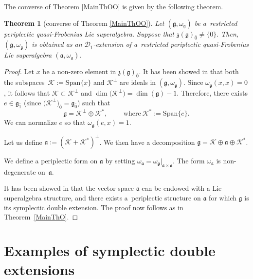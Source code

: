 \documentclass[pdftex]{sigma}
\numberwithin{equation}{section}
\newtheorem{Theorem}{Theorem}[section]
\begin{document}
The converse of Theorem \ref{MainThOO} is given by the following theorem.

\begin{Theorem}[converse of Theorem \ref{MainThOO}]
\label{Rec4}
Let $(\mathfrak{g},\omega_\mathfrak{g})$ be a~restricted periplectic quasi-Frobenius Lie superalgebra. Suppose that $\mathfrak{z}(\mathfrak{g})_{\bar 0}\not=\{0\}.$ Then, $(\mathfrak{g},\omega_\mathfrak{g})$ is obtained as an ${\mathscr D}_{\bar 1}$-extension of a~restricted periplectic quasi-Frobenius Lie superalgebra $(\mathfrak{a},\omega_\mathfrak{a})$.

\end{Theorem}
\begin{proof}

Let $x$ be a non-zero element in $\mathfrak{z}(\mathfrak{g})_{\bar 0}$. It has been showed in \cite{BM} that both the subspaces~$\mathscr{K}:=\mathrm{Span}\{x\}$ and $\mathscr{K}^\perp$ are ideals in $(\mathfrak{g},\omega_\mathfrak{g})$. Since $\omega_\mathfrak{g}(x,x)=0$, it follows that $\mathscr{K}\subset \mathscr{K}^\perp$ and $\dim\bigl(\mathscr{K}^\perp\bigr)=\dim(\mathfrak{g})-1$. Therefore, there exists $e \in \mathfrak{g}_{\bar 1}$ \big(since $\bigl(\mathscr{K}^\perp\bigr)_{\bar 0}=\mathfrak{g}_{\bar 0}$\big) such that
\[
\mathfrak{g}=\mathscr{K}^\perp\oplus \mathscr{K}^*, \qquad \text{ where}\ \mathscr{K}^*:=\mathrm{Span}\{e\}.
\]
We can normalize $e$ so that $\omega_\mathfrak{g}(e,x)=1$.

Let us define $\mathfrak{a}:=(\mathscr{K} +\mathscr{K}^*)^\perp$. We then have a decomposition $\mathfrak{g}=\mathscr{K} \oplus \mathfrak{a} \oplus \mathscr{K}^*$.

We define a periplectic form on $\mathfrak{a}$ by setting $
\omega_\mathfrak{a}={\omega_\mathfrak{g}}\vert_{\mathfrak{a}\times \mathfrak{a}}.
$
The form $\omega_\mathfrak{a}$ is non-degenerate on~$\mathfrak{a}$.

It has been showed in \cite{BM} that the vector space $\mathfrak{a}$ can be endowed with a Lie superalgebra structure, and there exists a~periplectic structure on $\mathfrak{a}$ for which $\mathfrak{g}$ is its symplectic double extension. The proof now follows as in Theorem~\ref{MainThO}.\end{proof}
\section{Examples of symplectic double extensions}\label{sec5}
\end{document}
